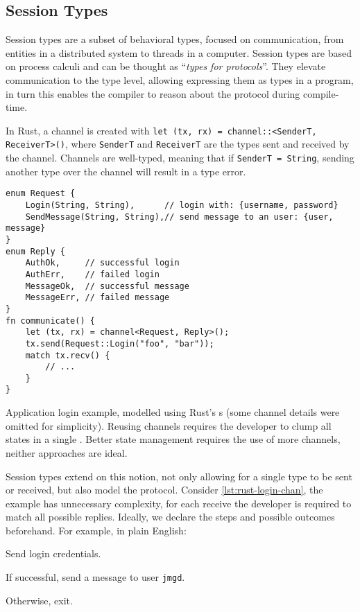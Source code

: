 \subsection{Session Types}

Session types are a subset of behavioral types, focused on communication,
from entities in a distributed system to threads in a computer.
Session types are based on process calculi and can be thought as “\emph{types for protocols}”.
They elevate communication to the type level, allowing expressing them as types in a program,
in turn this enables the compiler to reason about the protocol during compile-time.

In Rust, a channel is created with \texttt{let (tx, rx) = channel::<SenderT, ReceiverT>()},
where \texttt{SenderT} and \texttt{ReceiverT} are the types sent and received by the channel.
Channels are well-typed, meaning that if \texttt{SenderT = String},
sending another type over the channel will result in a type error.

\begin{listing}
    \centering
    \begin{verbatim}
enum Request {
    Login(String, String),      // login with: {username, password}
    SendMessage(String, String),// send message to an user: {user, message}
}
enum Reply {
    AuthOk,     // successful login
    AuthErr,    // failed login
    MessageOk,  // successful message
    MessageErr, // failed message
}
fn communicate() {
    let (tx, rx) = channel<Request, Reply>();
    tx.send(Request::Login("foo", "bar"));
    match tx.recv() {
        // ...
    }
}
    \end{verbatim}
    \caption{
        Application login example, modelled using Rust's s
        (some channel details were omitted for simplicity).
        Reusing channels requires the developer to clump all states in a single .
        Better state management requires the use of more channels, neither approaches are ideal.
    }
    \label{lst:rust-login-chan}
\end{listing}

Session types extend on this notion, not only allowing for a single type to be sent or received,
but also model the protocol.
Consider \autoref{lst:rust-login-chan}, the example has unnecessary complexity,
for each receive the developer is required to match all possible replies.
Ideally, we declare the steps and possible outcomes beforehand.
For example, in plain English:
\begin{compactenum}
    \item Send login credentials.
    \item If successful, send a message to user \texttt{jmgd}.
    \item Otherwise, exit.
\end{compactenum}

